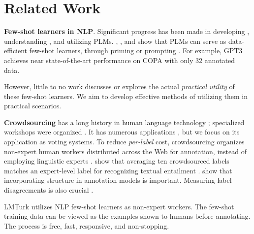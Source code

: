 \documentclass[11pt]{article}
\def\md{LMTurk\xspace}
\begin{document}
\section{Related Work}
\textbf{Few-shot learners in NLP}.
Significant progress
has been made in
developing \citep{devlin-etal-2019-bert,ELMopaper,XLNetpaper,GPT3paper},
understanding \citep{liulinguistic,tenney2018what,
  belinkov-glass-2019-analysis,hewitt-liang-2019-designing,
  hewitt-manning-2019-structural,zhao-etal-2020-quantifying,
  BERTologypaper},
and utilizing \citep{
  adapterpaper,maskingpaper,
  GPT3paper,lisaprefix,
  PETpaper,Prompttuningpaper,mi2021cins}
PLMs.
\citet{GPT3paper},
\citet{PETpaper},
and \citet{Ptuningpaper}
show that PLMs can serve as
data-efficient few-shot learners,
through priming or prompting \citep{liu2021pre}.
For example, GPT3 achieves
near state-of-the-art
performance on COPA \citep{roemmele2011choice}
with only 32 annotated data.


However,
little to no
work discusses
or explores the
actual \emph{practical utility}
of these few-shot learners.
We aim to develop
effective methods of
utilizing them
in practical scenarios.



\textbf{Crowdsourcing} has a
long history
in human language technology
\citep{crowdsourcingagg,callison-burch-2009-fast,
  trautmann2020fine}; specialized
workshops were
organized
\citep{crowdsourws,emnlp-2019-aggregating}.
It has numerous applications
\citep{crowdsourcingsurvey},
but we focus on its
application as
voting systems.
To reduce \emph{per-label} cost,
crowdsourcing organizes
non-expert human workers
distributed across the Web for annotation,
instead of employing linguistic experts
\citep{jamison-gurevych-2015-noise,
  bhardwaj-etal-2019-carb,
  nangia-etal-2021-ingredients}.
\citet{snow-etal-2008-cheap}
show that
averaging ten crowdsourced labels
matches an expert-level label for
recognizing textual entailment \citep{rtedata}.
\citet{paun-etal-2018-comparing}
show that incorporating structure in
annotation models is important.
Measuring label disagreements
is also crucial \citep{dumitrache2021empirical}.



\md
utilizes NLP few-shot learners
as non-expert workers.
The few-shot training data
can be viewed as the examples
shown
to humans before annotating.
The process is
free, fast, responsive, and non-stopping.
\end{document}
